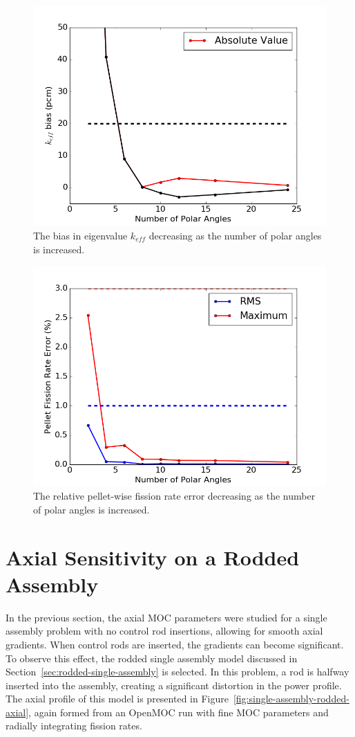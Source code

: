 \begin{figure}[h!]
	\centering
	\includegraphics[width=0.7\linewidth]{figures/results/sensitivity/polar_angles_pcm.png}
	\caption[]{The bias in eigenvalue $k_{\textit{eff}}$ decreasing as the number of polar angles is increased.}
	\label{fig:polar-angles-pcm}
\end{figure}
\begin{figure}[h!]
	\centering
	\includegraphics[width=0.7\linewidth]{figures/results/sensitivity/polar_angles_fr.png}
	\caption[]{The relative pellet-wise fission rate error decreasing as the number of polar angles is increased.}
	\label{fig:polar-angles-fr}
\end{figure}


\newpage
\section{Axial Sensitivity on a Rodded Assembly}
\label{sec:axial-sensitivity-rodded}

In the previous section, the axial \ac{MOC} parameters were studied for a single assembly problem with no control rod insertions, allowing for smooth axial gradients. When control rods are inserted, the gradients can become significant. To observe this effect, the rodded single assembly model discussed in Section~\ref{sec:rodded-single-assembly} is selected. In this problem, a rod is halfway inserted into the assembly, creating a significant distortion in the power profile. The axial profile of this model is presented in Figure~\ref{fig:single-assembly-rodded-axial}, again formed from an OpenMOC run with fine \ac{MOC} parameters and radially integrating fission rates.

